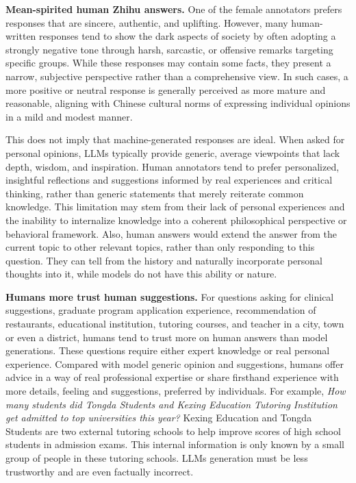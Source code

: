 \textbf{Mean-spirited human Zhihu answers.}
One of the female annotators prefers responses that are sincere, authentic, and uplifting. However, many human-written responses tend to show the dark aspects of society by often adopting a strongly negative tone through harsh, sarcastic, or offensive remarks targeting specific groups. While these responses may contain some facts, they present a narrow, subjective perspective rather than a comprehensive view. In such cases, a more positive or neutral response is generally perceived as more mature and reasonable, aligning with Chinese cultural norms of expressing individual opinions in a mild and modest manner.  

This does not imply that machine-generated responses are ideal. When asked for personal opinions, LLMs typically provide generic, average viewpoints that lack depth, wisdom, and inspiration. Human annotators tend to prefer personalized, insightful reflections and suggestions informed by real experiences and critical thinking, rather than generic statements that merely reiterate common knowledge. This limitation may stem from their lack of personal experiences and the inability to internalize knowledge into a coherent philosophical perspective or behavioral framework.
Also, human answers would extend the answer from the current topic to other relevant topics, rather than only responding to this question.
They can tell from the history and naturally incorporate personal thoughts into it, while models do not have this ability or nature. 


\textbf{Humans more trust human suggestions.}
For questions asking for clinical suggestions, graduate program application experience, recommendation of restaurants, educational institution, tutoring courses, and teacher in a city, town or even a district, humans tend to trust more on human answers than model generations.
These questions require either expert knowledge or real personal experience.
Compared with model generic opinion and suggestions, humans offer advice in a way of real professional expertise or share firsthand experience with more details, feeling and suggestions, preferred by individuals.
For example, \textit{How many students did Tongda Students and Kexing Education Tutoring Institution get admitted to top universities this year?} Kexing Education and Tongda Students are two external tutoring schools to help improve scores of high school students in admission exams. This internal information is only known by a small group of people in these tutoring schools. LLMs generation must be less trustworthy and are even factually incorrect. 


